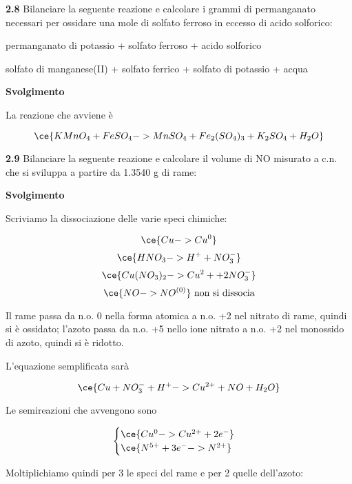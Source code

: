 \vspace{0.2cm}\textbf{2.8} Bilanciare la seguente reazione e calcolare i grammi di permanganato necessari per ossidare una
mole di solfato ferroso in eccesso di acido solforico:

\begin{center}
permanganato di potassio + solfato ferroso + acido solforico \ce{->}

\ce{->}solfato di manganese(II) + solfato ferrico + solfato di potassio + acqua
\end{center}

\large\textbf{Svolgimento}\normalsize

\vspace{0.2cm}La reazione che avviene è

$$\ce{KMnO_4 + FeSO_4 -> MnSO_4 + Fe_2(SO_4)_3 + K_2SO_4 + H_2O}$$

\vspace{0.2cm}\textbf{2.9} Bilanciare la seguente reazione e calcolare il volume di NO misurato a c.n. che si sviluppa a
partire da 1.3540 g di rame:

\begin{center}
\end{center}

\large\textbf{Svolgimento}\normalsize

\vspace{0.2cm}Scriviamo la dissociazione delle varie speci chimiche:

$$\ce{Cu -> Cu^0}$$
$$\ce{HNO_3 -> H^+ + NO_3^-}$$
$$\ce{Cu(NO_3)_2 -> Cu^2+ + 2NO_3^-}$$
$$\ce{NO -> NO^{(0)}} \text{ non si dissocia}$$

Il rame passa da n.o. 0 nella forma atomica a n.o. +2 nel nitrato di rame, quindi si è ossidato; l'azoto passa da n.o. +5 nello ione nitrato a n.o. +2 nel monossido di azoto, quindi si è ridotto.

L'equazione semplificata sarà

$$\ce{Cu + NO_3^- + H^+ -> Cu^{2+} + NO + H_2O}$$

Le semireazioni che avvengono sono

$$\begin{cases}
    \ce{Cu^0 -> Cu^{2+} + 2e^-}\\
    \ce{N^{5+} + 3e^- -> N^{2+}}
\end{cases}$$

Moltiplichiamo quindi per 3 le speci del rame e per 2 quelle dell'azoto:

